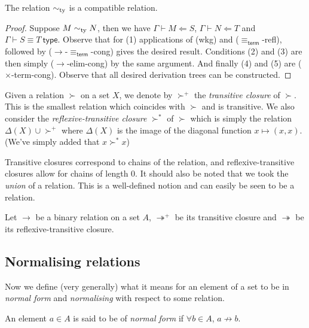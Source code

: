 \begin{lemma}
    The relation $\sim_{\mathrm{ty}}$ is a compatible relation.
\end{lemma}

\begin{proof}
    Suppose $M \sim_{\mathrm{ty}} N$, then we have $\Gamma \vdash M \Leftarrow S$, $\Gamma \vdash N \Leftarrow T$ and $\Gamma \vdash S \equiv T \ \mathsf{type}$.
    Observe that for (1) applications of (wkg) and ($\equiv_{\mathsf{term}}$-refl), followed by ($\to$-$\equiv_{\mathsf{term}}$-cong) gives the desired result. Conditions (2) and (3) are then simply ($\to$-elim-cong) by the same argument. And finally (4) and (5) are ($\times$-term-cong). Observe that all desired derivation trees can be constructed.
\end{proof}

\begin{defin}
    Given a relation $\succ$ on a set $X$, we denote by $\succ^+$ the \emph{transitive closure} of $\succ$. This is the smallest relation which coincides with $\succ$ and is transitive. We also consider the \emph{reflexive-transitive closure} $\succ^*$ of $\succ$ which is simply the relation $\Delta(X)\cup \succ^+ $ where $\Delta(X)$ is the image of the diagonal function $x \mapsto (x,x)$. (We've simply added that $x \succ^* x$)
\end{defin}

\begin{remark}
    Transitive closures correspond to chains of the relation, and reflexive-transitive closures allow for chains of length $0$. It should also be noted that we took the \emph{union} of a relation. This is a well-defined notion and can easily be seen to be a relation.
\end{remark}

Let $\to$ be a binary relation on a set $A$, $\twoheadrightarrow^+$ be its transitive closure and $\twoheadrightarrow$ be its reflexive-transitive closure.

\subsection{Normalising relations}

Now we define (very generally) what it means for an element of a set to be in \emph{normal form} and \emph{normalising} with respect to some relation.

\begin{defin}
    An element $a \in A$ is said to be of \emph{normal form} if $\forall b \in A$, $a {\not \to} b$.
\end{defin}

